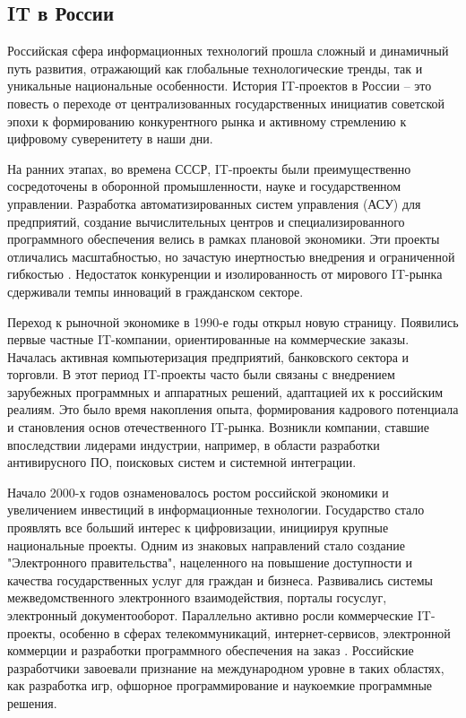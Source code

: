 \subsection{IT в России}

Российская сфера информационных технологий прошла сложный и динамичный путь развития, отражающий как глобальные технологические тренды, так и уникальные национальные особенности. История IT-проектов в России – это повесть о переходе от централизованных государственных инициатив советской эпохи к формированию конкурентного рынка и активному стремлению к цифровому суверенитету в наши дни.

На ранних этапах, во времена СССР, IT-проекты были преимущественно сосредоточены в оборонной промышленности, науке и государственном управлении. Разработка автоматизированных систем управления (АСУ) для предприятий, создание вычислительных центров и специализированного программного обеспечения велись в рамках плановой экономики. Эти проекты отличались масштабностью, но зачастую инертностью внедрения и ограниченной гибкостью \cite{management3}. Недостаток конкуренции и изолированность от мирового IT-рынка сдерживали темпы инноваций в гражданском секторе.

Переход к рыночной экономике в 1990-е годы открыл новую страницу. Появились первые частные IT-компании, ориентированные на коммерческие заказы. Началась активная компьютеризация предприятий, банковского сектора и торговли. В этот период IT-проекты часто были связаны с внедрением зарубежных программных и аппаратных решений, адаптацией их к российским реалиям. Это было время накопления опыта, формирования кадрового потенциала и становления основ отечественного IT-рынка. Возникли компании, ставшие впоследствии лидерами индустрии, например, в области разработки антивирусного ПО, поисковых систем и системной интеграции.

Начало 2000-х годов ознаменовалось ростом российской экономики и увеличением инвестиций в информационные технологии. Государство стало проявлять все больший интерес к цифровизации, инициируя крупные национальные проекты. Одним из знаковых направлений стало создание "Электронного правительства", нацеленного на повышение доступности и качества государственных услуг для граждан и бизнеса. Развивались системы межведомственного электронного взаимодействия, порталы госуслуг, электронный документооборот. Параллельно активно росли коммерческие IT-проекты, особенно в сферах телекоммуникаций, интернет-сервисов, электронной коммерции и разработки программного обеспечения на заказ \cite{management5}. Российские разработчики завоевали признание на международном уровне в таких областях, как разработка игр, офшорное программирование и наукоемкие программные решения.

